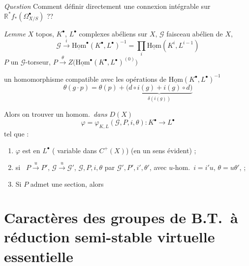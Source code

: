 \documentclass[11pt,a4paper]{article}
\begin{document}
\emph{Question} Comment définir directement une connexion
intégrable sur $\mathbb{R}^{*} f_{*}(\Omega^{\bullet}_{X/S})$ ??

\emph{Lemme} $X$ topos, $K^{\bullet}$, $L^{\bullet}$ complexes abéliens sur
$X$, $\mathcal{G}$ faisceau abélien de $X$,
\[
\mathcal{G} \xrightarrow{\ i\ } \underline{\mathrm{Hom}}^{\bullet}(K^{\bullet}, L^{\bullet})^{-1}
= \prod_i \underline{\mathrm{Hom}}(K^{i}, L^{i-1})
\]
$P$ un $\mathcal{G}$-torseur,
$P \xrightarrow{\ \theta\ } Z\bigl(\underline{\mathrm{Hom}}^{\bullet}(K^{\bullet}, L^{\bullet})^{(0)}\bigr)$

un homomorphisme compatible avec les opérations de
$\underline{\mathrm{Hom}}(K^{\bullet}, L^{\bullet})^{-1}$
\[
\theta(g \cdot p) = \theta(p) + \underbrace{\bigl(d \circ i(g) + i(g) \circ d\bigr)}_{\delta(i(g))}
\]

Alors on  trouver un homom.\ \emph{dans} $D(X)$
\[
\varphi = \varphi_{K, L}(\mathcal{G}, P, i, \theta) : K^{\bullet} \longrightarrow L^{\bullet}
\]
tel que :
\begin{enumerate}
\item[1°)] $\varphi$ est  en $L^{\bullet}$
( variable dans $C^{+}(X)$) (en un sens évident) ;
\item[2°)]  
\ill{} \ill{} si \ill{} \ $P \xrightarrow{u} P'$,
$\mathcal{G} \xrightarrow{u} \mathcal{G}'$, $\mathcal{G}, P, i, \theta$ par
$\mathcal{G}', P', i', \theta'$, avec  $u$-hom.\ $i = i' u$,
$\theta = u \theta'$,  ;
\item[3°)] Si $P$ admet une section, alors
\end{enumerate}

\section*{Caractères des groupes de B.T.\ à réduction semi-stable virtuelle essentielle}

\end{document}
